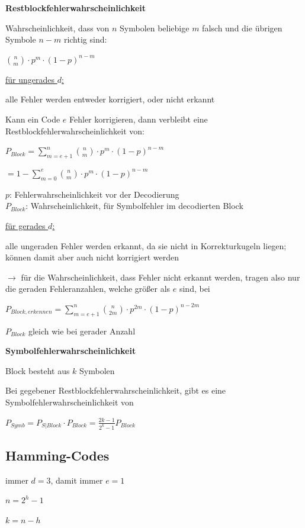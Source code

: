 \textbf{Restblockfehlerwahrscheinlichkeit}

Wahrscheinlichkeit, dass von $n$ Symbolen beliebige $m$ falsch und die übrigen Symbole $n-m$ richtig sind:

$\displaystyle{
    \binom{n}{m} \cdot p^m \cdot (1 - p)^{n-m}
}$

\underline{für ungerades $d$:}

alle Fehler werden entweder korrigiert, oder nicht erkannt

Kann ein Code $e$ Fehler korrigieren, dann verbleibt eine Restblockfehlerwahrscheinlichkeit von:

$\displaystyle{
    P_{Block} = \sum_{m = e + 1}^{n} \binom{n}{m} \cdot p^m \cdot (1 - p)^{n-m}
}$

$\displaystyle{
    = 1 - \sum_{m=0}^{e} \binom{n}{m} \cdot p^m \cdot (1 - p)^{n-m}
}$

$p$: Fehlerwahrscheinlichkeit vor der Decodierung\\
$P_{Block}$: Wahrscheinlichkeit, für Symbolfehler im decodierten Block

\underline{für gerades $d$:}

alle ungeraden Fehler werden erkannt, da sie nicht in Korrekturkugeln liegen; können damit aber auch
nicht korrigiert werden

$\rightarrow$ für die Wahrscheinlichkeit, dass Fehler nicht erkannt werden, tragen also nur die geraden Fehleranzahlen, welche größer als $e$ sind, bei

$\displaystyle{
    P_{Block,erkennen} = \sum_{m=e+1}^{n} \binom{n}{2m} \cdot p^{2m} \cdot (1 - p)^{n-2m}
}$

$P_{Block}$ gleich wie bei gerader Anzahl

\textbf{Symbolfehlerwahrscheinlichkeit}

Block besteht aus $k$ Symbolen

Bei gegebener Restblockfehlerwahrscheinlichkeit, gibt es eine Symbolfehlerwahrscheinlichkeit von

$\displaystyle{
    P_{Symb} = P_{S|Block} \cdot P_{Block} = \frac{2{k-1}}{2^k - 1} P_{Block}
}$

\subsection{Hamming-Codes}

immer $d=3$, damit immer $e=1$

$\displaystyle{
    n = 2^h - 1
}$

$\displaystyle{
    k = n - h
}$

